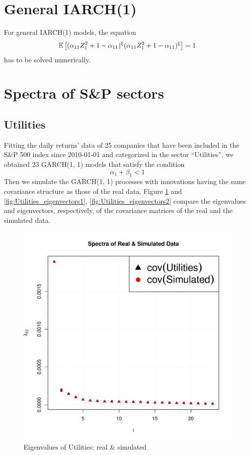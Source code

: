 \documentclass{article}
\begin{document}
\section{General IARCH(1)}
For general IARCH(1) models, the equation
\begin{equation*}
  \mathbb{E} \left[
    (
    \alpha_{11} Z_1^2 + 1 - \alpha_{11}
    )^\xi
    (
    \alpha_{11} Z_1^2 + 1 - \alpha_{11}
    )^\xi\right] = 1
\end{equation*}
has to be solved numerically.
\section{Spectra of S\&P sectors}
\subsection{Utilities}
Fitting the daily returns' data of 25 companies that have been
included in the S\&P 500 index since 2010-01-01 and categorized in the
sector ``Utilities'', we obtained 23 GARCH(1, 1) models that satisfy
the condition
\begin{equation}
  \label{eq:garch_cond1}
  \alpha_1 + \beta_1 < 1  
\end{equation}
Then we simulate the GARCH(1, 1) processes with innovations having the
same covariance structure as those of the real data. Figure
\ref{fig:Utilities_eigenvalues} and \ref{fig:Utilities_eigenvectors1},
\ref{fig:Utilities_eigenvectors2}
compare the eigenvalues and eigenvectors, respectively, of the 
covariance matrices of the real and the simulated data.
\begin{figure}[htb!]
  \centering
  \includegraphics[scale=0.6]{Utilities_eigenvalues.pdf}
  \caption{Eigenvalues of Utilities: real \& simulated}
  \label{fig:Utilities_eigenvalues}
\end{figure}
\end{document}
